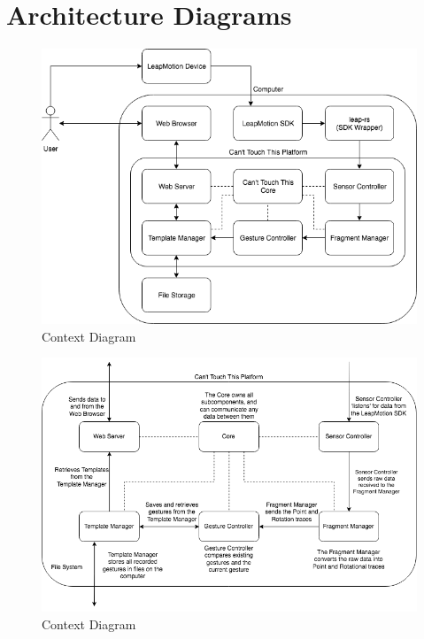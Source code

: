 \documentclass[a4paper]{article}
\begin{document}

  \section{Architecture Diagrams}
  \begin{figure}[h]
    \caption{Context Diagram}
    \centering
    \includegraphics[width=\linewidth]{context-diagram}
  \end{figure}
  \begin{figure}[h]
    \caption{Context Diagram}
    \centering
    \includegraphics[width=\linewidth]{functional-diagram}
  \end{figure}
  \clearpage
\end{document}
